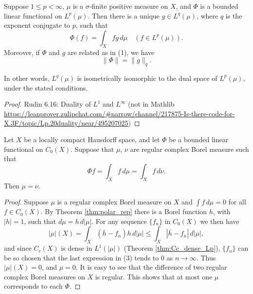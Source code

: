 \begin{theorem}[Rudin 6.16]
  \label{thm:Lp_duality}
  Suppose $1 \leq p < \infty$, $\mu$ is a $\sigma$-finite positive measure on $X$, and $\Phi$ is a bounded linear functional on $L^p(\mu)$. Then there is a unique $g \in L^q(\mu)$, where $q$ is the exponent conjugate to $p$, such that
  \begin{equation}
    \Phi(f) = \int_X fg \, d\mu \quad (f \in L^p(\mu)).
  \end{equation}
  Moreover, if $\Phi$ and $g$ are related as in (1), we have
  \begin{equation}
    \|\Phi\| = \|g\|_q.
  \end{equation}

  In other words, $L^q(\mu)$ is isometrically isomorphic to the dual space of $L^p(\mu)$, under the stated conditions.
\end{theorem}

\begin{proof}
  Rudin 6.16: Duality of $L^1$ and $L^∞$ (not in Mathlib
  \url{https://leanprover.zulipchat.com/#narrow/channel/217875-Is-there-code-for-X.3F/topic/Lp.20duality/near/495207025})
\end{proof}


\begin{lemma}
  \label{lem:rieszMeasure_unique}
  Let $X$ be a locally compact Hausdorff space, and let $\Phi$ be a bounded linear functional on $C_0(X)$.
  Suppose that $\mu$, $\nu$ are regular complex Borel measure such that
  \begin{equation*}
    \Phi f = \int_X f \, d\mu = \int_X f \, d\nu.
  \end{equation*}
  Then \(\mu = \nu\).
\end{lemma}

\begin{proof}
  Suppose $\mu$ is a regular complex Borel measure on $X$ and $\int f \, d\mu = 0$ for all $f \in C_0(X)$.
  By Theorem \ref{thm:polar_rep} there is a Borel function $h$, with $|h| = 1$, such that $d\mu = h \, d|\mu|$.
  For any sequence $\{f_n\}$ in $C_0(X)$ we then have
  \begin{equation}
    |\mu|(X) = \int_X (\bar{h} - f_n)h \, d|\mu| \leq \int_X |\bar{h} - f_n| \, d|\mu|, \tag{3}
  \end{equation}
  and since $C_c(X)$ is dense in $L^1(|\mu|)$ (Theorem \ref{thm:Cc_dense_Lp}), $\{f_n\}$ can be so chosen that the last expression in (3) tends to 0 as $n \to \infty$.
  Thus $|\mu|(X) = 0$, and $\mu = 0$.
  It is easy to see that the difference of two regular complex Borel measures on $X$ is regular.
  This shows that at most one $\mu$ corresponds to each $\Phi$.
\end{proof}


